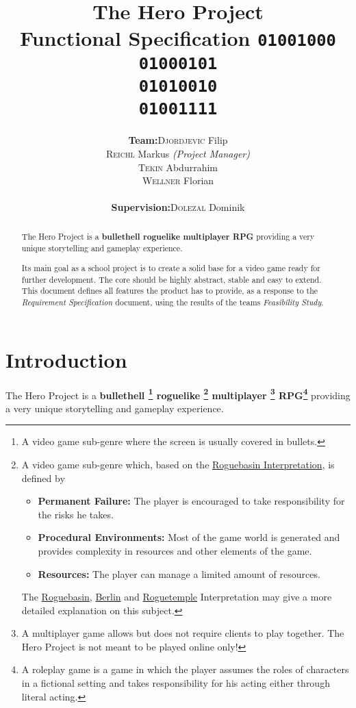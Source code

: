 \documentclass[11pt]{article}
\title{
  \textbf{The Hero Project}\\
  \large{Functional Specification}
  \linebreak
  \linebreak
  \small{\texttt{01001000\\01000101\\01010010\\01001111}}
}
\author{
  \begin{tabular}{rl}
    \textbf{Team:}
    & \textsc{Djordjevic} Filip\\
    & \textsc{Reichl} Markus \small{\textit{(Project Manager)}}\\
    & \textsc{Tekin} Abdurrahim\\
    & \textsc{Wellner} Florian\\
    \\
    \textbf{Supervision:}
    & \textsc{Dolezal} Dominik
  \end{tabular}
}
\begin{document}
\begin{titlepage}
  \clearpage
  \maketitle
  \thispagestyle{empty}
  
  \begin{abstract}
    \begin{flushleft}
      The Hero Project is a \textbf{bullethell roguelike multiplayer RPG} providing a very unique storytelling and gameplay experience.
      
      Its main goal as a school project is to create a solid base for a video game ready for further development. The core should be highly abstract, stable and easy to extend.
      \linebreak
      \linebreak
      This document defines all features the product has to provide, as a response to the \textit{Requirement Specification} document, using the results of the teams \textit{Feasibility Study}.
     \end{flushleft}
  \end{abstract}
\end{titlepage}

\tableofcontents
\newpage

\section{Introduction}
The Hero Project is a \textbf{
  bullethell
  \footnote{A video game sub-genre where the screen is usually covered in bullets.}
  roguelike
  \footnote{A video game sub-genre which, based on the \href{http://roguebasin.com/roguelike-definition}{Roguebasin Interpretation}, is defined by 
    \begin{itemize}
      \item \textbf{Permanent Failure:} The player is encouraged to take responsibility for the risks he takes.
      \item \textbf{Procedural Environments:} Most of the game world is generated and provides complexity in resources and other elements of the game.
      \item \textbf{Resources:} The player can manage a limited amount of resources.
    \end{itemize}
    The \href{http://roguebasin.com/roguelike-definition}{Roguebasin}, \href{http://roguebasin.com/index.php?title=Berlin_Interpretation}{Berlin} and \href{http://roguetemple.com/roguelike-definition}{Roguetemple} Interpretation may give a more detailed explanation on this subject.
  }
  multiplayer
  \footnote{A multiplayer game allows but does not require clients to play together. The Hero Project is not meant to be played online only!}
  RPG\footnote{A roleplay game is a game in which the player assumes the roles of characters in a fictional setting and takes responsibility for his acting either through literal acting.}
} providing a very unique storytelling and gameplay experience.
\end{document}
